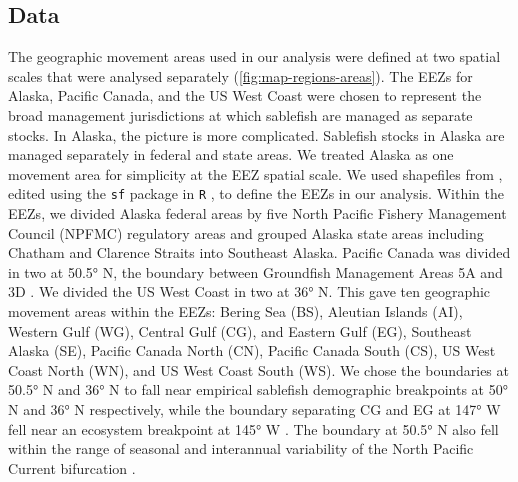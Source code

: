 \documentclass{article}
\begin{document}


\subsection{Data}
The geographic movement areas used in our analysis were defined at two spatial scales that were analysed separately (\autoref{fig:map-regions-areas}). The EEZs for Alaska, Pacific Canada, and the US West Coast were chosen to represent the broad management jurisdictions at which sablefish are managed as separate stocks. In Alaska, the picture is more complicated. Sablefish stocks in Alaska are managed separately in federal and state areas. We treated Alaska as one movement area for simplicity at the EEZ spatial scale. We used shapefiles from \cite{flanders2018},  edited using the \texttt{sf} package in \texttt{R} \cite[][]{pebezma2018, r2020}, to define the EEZs in our analysis. Within the EEZs, we divided Alaska federal areas by five North Pacific Fishery Management Council (NPFMC) regulatory areas and grouped Alaska state areas including Chatham and Clarence Straits into Southeast Alaska. Pacific Canada was divided in two at \ang{50.5} N, the boundary between Groundfish Management Areas 5A and 3D \cite[][]{sor2007}. We divided the US West Coast in two at \ang{36} N. This gave ten geographic movement areas within the EEZs: Bering Sea (BS), Aleutian Islands (AI), Western Gulf (WG), Central Gulf (CG), and Eastern Gulf (EG), Southeast Alaska (SE), Pacific Canada North (CN), Pacific Canada South (CS), US West Coast North (WN), and US West Coast South (WS). We chose the boundaries at \ang{50.5} N and \ang{36} N to fall near empirical sablefish demographic breakpoints at \ang{50} N and \ang{36} N respectively, while the boundary separating CG and EG at \ang{147} W fell near an ecosystem breakpoint at \ang{145} W  \cite[][]{kapur2020}. The boundary at \ang{50.5} N also fell within the range of seasonal and interannual variability of the North Pacific Current bifurcation \cite[][]{sydeman2011}.
\end{document}
